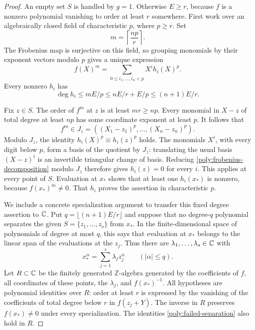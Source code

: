 \begin{proof}
An empty set $S$ is handled by $g=1$.  Otherwise $E\ge r$, because
$f$ is a nonzero polynomial vanishing to order at least $r$ somewhere.
First work over an algebraically closed field of characteristic $p$,
where $p\ge r$.  Set
\[
 m=\left\lceil\frac{np}{r}\right\rceil.
\]
The Frobenius map is surjective on this field, so grouping monomials by
their exponent vectors modulo $p$ gives a unique expression
\begin{equation}\label{poly:frobenius-decomposition}
 f(X)^m=\sum_{0\le i_1,\ldots,i_n<p}X^i h_i(X)^p.
\end{equation}
Every nonzero $h_i$ has
\[
 \deg h_i\le mE/p\le nE/r+E/p\le(n+1)E/r.
\]

Fix $z\in S$.  The order of $f^m$ at $z$ is at least $mr\ge np$.
Every monomial in $X-z$ of total degree at least $np$ has some
coordinate exponent at least $p$.  It follows that
\[
 f^m\in J_z=((X_1-z_1)^p,\ldots,(X_n-z_n)^p).
\]
Modulo $J_z$, the identity $h_i(X)^p\equiv h_i(z)^p$ holds.  The
monomials $X^i$, with every digit below $p$, form a basis of the
quotient by $J_z$: translating the usual basis $(X-z)^i$ is an
invertible triangular change of basis.  Reducing
\eqref{poly:frobenius-decomposition} modulo $J_z$ therefore gives
$h_i(z)=0$ for every $i$.  This applies at every point of $S$.
Evaluation at $x_*$ shows that at least one $h_i(x_*)$ is nonzero,
because $f(x_*)^m\ne0$.  That $h_i$ proves the assertion in
characteristic $p$.

We include a concrete specialization argument to transfer this fixed
degree assertion to $\mathbb C$.  Put $q=\lfloor(n+1)E/r\rfloor$ and suppose
that no degree-$q$ polynomial separates the given $S=\{z_1,\ldots,z_s\}$
from $x_*$.  In the finite-dimensional space of polynomials of degree
at most $q$, this says that evaluation at $x_*$ belongs to the linear
span of the evaluations at the $z_j$.  Thus there are
$\lambda_1,\ldots,\lambda_s\in\mathbb C$ with
\begin{equation}\label{poly:failed-separation}
 x_*^\alpha=\sum_{j=1}^s\lambda_j z_j^\alpha
            \qquad(|\alpha|\le q).
\end{equation}
Let $R\subset\mathbb C$ be the finitely generated $\mathbb Z$-algebra generated
by the coefficients of $f$, all coordinates of these points, the
$\lambda_j$, and $f(x_*)^{-1}$.  All hypotheses are polynomial
identities over $R$: order at least $r$ is expressed by the vanishing
of the coefficients of total degree below $r$ in $f(z_j+Y)$.
The inverse in $R$ preserves $f(x_*)\ne0$ under every specialization.
The identities \eqref{poly:failed-separation} also hold in $R$.


\end{proof}
